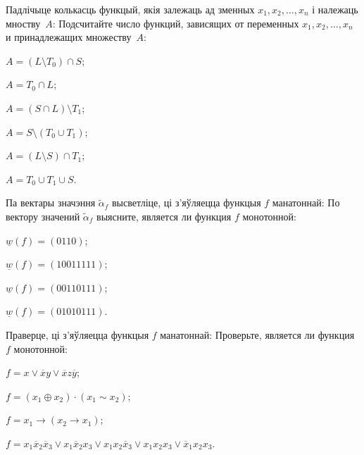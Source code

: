 \documentclass[12pt, a4paper]{article}
\begin{document}
\begin{problemList}
\smallskip

\problemItemWithCommonPart
{Падлічыце колькасць функцый, якія залежаць ад зменных $x_1, x_2, \ldots, x_n$ і належаць мноству~$A$:}
{Подсчитайте число функций, зависящих от переменных $x_1, x_2, \ldots, x_n$ и принадлежащих множеству~$A$:}
{%
\begin{belarusianEnumerateMulticol}
    \item $A=(L\setminus T_0)\cap S$;
    \item $A=T_0\cap L$;
    \item $A=(S\cap L)\setminus T_1$;
    \item $A=S\setminus(T_0\cup T_1)$;
    \item $A=(L\setminus S)\cap T_1$;
    \item $A=T_0 \cup T_1 \cup S$.
\end{belarusianEnumerateMulticol}
}

\smallskip

\problemItemWithCommonPart
{Па вектары значэння $\tilde\alpha_f$ высветліце, ці з'яўляецца функцыя $f$ манатоннай:}
{По вектору значений $\tilde\alpha_f$ выясните, является ли функция $f$ монотонной:}
{%
\begin{belarusianEnumerateMulticol}
    \item $\underline{w}(f)=(0110)$;
    \item $\underline{w}(f)=(10011111)$;
    \item $\underline{w}(f)=(00110111)$;
    \item $\underline{w}(f)=(01010111)$.
\end{belarusianEnumerateMulticol}
}

\smallskip

\problemItemWithCommonPart
{Праверце, ці з'яўляецца функцыя $f$ манатоннай:}
{Проверьте, является ли функция $f$ монотонной:}
{%
\begin{belarusianEnumerate}
    \item $f=x\vee \overline{x}y\vee\overline{x}z\overline{y}$;
    \item $f=(x_1\oplus x_2)\cdot(x_1\sim x_2)$;
    \item $f=x_1\rightarrow (x_2 \rightarrow x_1)$;
    \item $f=x_1\overline{x}_2\overline{x}_3\vee x_1\overline{x}_2x_3\vee x_1x_2\overline{x}_3\vee x_1x_2x_3\vee \overline{x}_1x_2x_3$.
\end{belarusianEnumerate}
}

\smallskip


\end{problemList}
\end{document}
